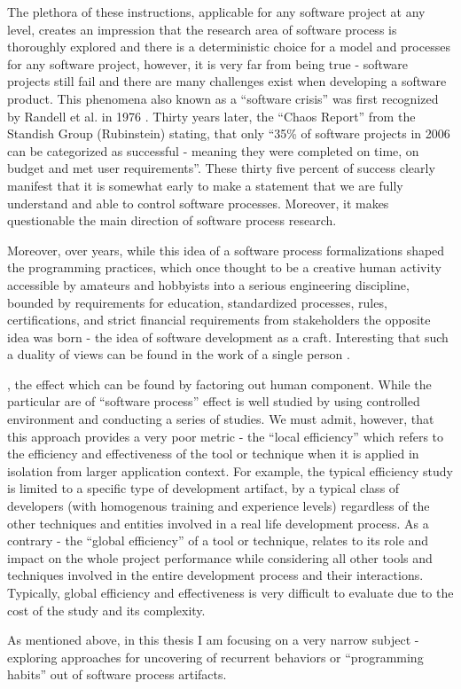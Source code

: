 The plethora of these instructions, applicable for any software project at any level, creates 
an impression that the research area of software process is thoroughly explored and there 
is a deterministic choice for a model and processes for any software project, however,
it is very far from being true - software projects still fail and there are many challenges exist 
when developing a software product.
This phenomena also known as a ``software crisis'' was first recognized by Randell et al. in 1976 
\cite{naur1976software}. Thirty years later, the ``Chaos Report'' from the Standish 
Group (Rubinstein) \cite{SDTimes} stating, that only ``35\% of software projects in 2006 can 
be categorized as successful - meaning they were completed on time, on budget and met 
user requirements''. These thirty five percent of success clearly manifest that it is somewhat 
early to make a statement that we are fully understand and able to control software processes.
Moreover, it makes questionable the main direction of software process research.

Moreover, over years, while this idea of a software process formalizations shaped the 
programming practices, which once thought to be a creative human activity accessible by amateurs 
and hobbyists \cite{citeulike:9958822} into a serious engineering discipline, bounded 
by requirements for education, standardized processes, rules, certifications, and strict 
financial requirements from stakeholders the opposite idea was born - the idea of 
software development as a craft. Interesting that such a duality of views can be found 
in the work of a single person \cite{citeulike:5203446}.


, the effect which can be found by factoring out human component. 
While the particular are of ``software process'' effect is well studied by using controlled environment 
and conducting a series of studies. We must admit, however, that this approach provides a very poor metric - 
the ``local efficiency'' which refers to the efficiency and effectiveness of the tool or technique when it 
is applied in isolation from larger application context. 
For example, the typical efficiency study is limited to a specific type of development 
artifact, by a typical class of developers (with homogenous training and experience levels) 
regardless of the other techniques and entities involved in a real life development process. 
As a contrary  - the ``global efficiency'' of a tool or technique, relates to its role and 
impact on the whole project performance while considering all other tools and techniques 
involved in the entire development process and their interactions. Typically, global efficiency 
and effectiveness is very difficult to evaluate due to the cost of the study and its complexity.


As mentioned above, in this thesis I am focusing on a very narrow subject - exploring approaches
for uncovering of recurrent behaviors or ``programming habits'' out of software process artifacts.








